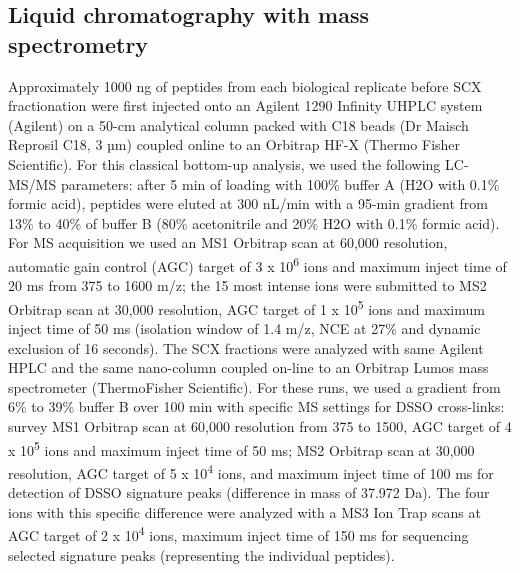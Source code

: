 \subsection*{Liquid chromatography with mass spectrometry}
Approximately 1000 ng of peptides from each biological replicate before SCX fractionation were first injected onto an Agilent 1290 Infinity UHPLC system (Agilent) on a 50-cm analytical column packed with C18 beads (Dr Maisch Reprosil C18, 3 µm) coupled online to an Orbitrap HF-X (Thermo Fisher Scientific). For this classical bottom-up analysis, we used the following LC-MS/MS parameters: after 5 min of loading with 100\% buffer A (H2O with 0.1\% formic acid), peptides were eluted at 300 nL/min with a 95-min gradient from 13\% to 40\% of buffer B (80\% acetonitrile and 20\% H2O with 0.1\% formic acid). For MS acquisition we used an MS1 Orbitrap scan at 60,000 resolution, automatic gain control (AGC) target of 3 x 10\textsuperscript{6} ions and maximum inject time of 20 ms from 375 to 1600 m/z; the 15 most intense ions were submitted to MS2 Orbitrap scan at 30,000 resolution, AGC target of 1 x 10\textsuperscript{5} ions and maximum inject time of 50 ms (isolation window of 1.4 m/z, NCE at 27\% and dynamic exclusion of 16 seconds). The SCX fractions were analyzed with same Agilent HPLC and the same nano-column coupled on-line to an Orbitrap Lumos mass spectrometer (ThermoFisher Scientific). For these runs, we used a gradient from 6\% to 39\% buffer B over 100 min with specific MS settings for DSSO cross-links: survey MS1 Orbitrap scan at 60,000 resolution from 375 to 1500, AGC target of 4 x 10\textsuperscript{5} ions and maximum inject time of 50 ms; MS2 Orbitrap scan at 30,000 resolution, AGC target of 5 x 10\textsuperscript{4} ions, and maximum inject time of 100 ms for detection of DSSO signature peaks (difference in mass of 37.972 Da). The four ions with this specific difference were analyzed with a MS3 Ion Trap scans at AGC target of 2 x 10\textsuperscript{4} ions, maximum inject time of 150 ms for sequencing selected signature peaks (representing the individual peptides).
%
